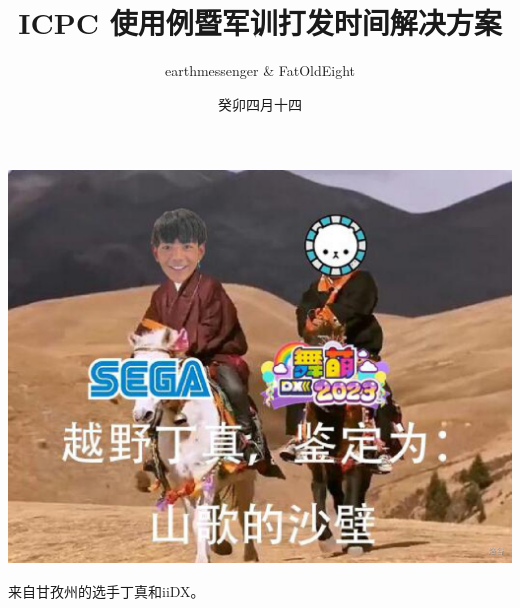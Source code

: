 \documentclass[sigconf, nonacm, timestamp, balance=false,manuscript]{acmart}
\title{ICPC 使用例暨军训打发时间解决方案}
\author{earthmessenger \& FatOldEight}
\date{癸卯四月十四}
\begin{document}
\begin{teaserfigure}
    \includegraphics[width=\textwidth]{fa6f4vdw.png}
    \caption{来自甘孜州的选手丁真和iiDX。}
\end{teaserfigure}
\maketitle


\clearpage

\tableofcontents



\end{document}

